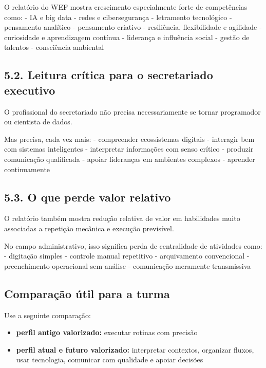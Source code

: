 \documentclass[
]{book}
\providecommand{\tightlist}{%
  \setlength{\itemsep}{0pt}\setlength{\parskip}{0pt}}
\theoremstyle{definition}
\theoremstyle{definition}
\theoremstyle{definition}
\theoremstyle{definition}
\theoremstyle{remark}
\begin{document}
O relatório do WEF mostra crescimento especialmente forte de competências como:
- IA e big data
- redes e cibersegurança
- letramento tecnológico
- pensamento analítico
- pensamento criativo
- resiliência, flexibilidade e agilidade
- curiosidade e aprendizagem contínua
- liderança e influência social
- gestão de talentos
- consciência ambiental

\subsection{5.2. Leitura crítica para o secretariado executivo}\label{leitura-cruxedtica-para-o-secretariado-executivo}

O profissional do secretariado não precisa necessariamente se tornar programador ou cientista de dados.

Mas precisa, cada vez mais:
- compreender ecossistemas digitais
- interagir bem com sistemas inteligentes
- interpretar informações com senso crítico
- produzir comunicação qualificada
- apoiar lideranças em ambientes complexos
- aprender continuamente

\subsection{5.3. O que perde valor relativo}\label{o-que-perde-valor-relativo}

O relatório também mostra redução relativa de valor em habilidades muito associadas a repetição mecânica e execução previsível.

No campo administrativo, isso significa perda de centralidade de atividades como:
- digitação simples
- controle manual repetitivo
- arquivamento convencional
- preenchimento operacional sem análise
- comunicação meramente transmissiva

\subsection{Comparação útil para a turma}\label{comparauxe7uxe3o-uxfatil-para-a-turma}

Use a seguinte comparação:

\begin{itemize}
\tightlist
\item
  \textbf{perfil antigo valorizado:} executar rotinas com precisão
\item
  \textbf{perfil atual e futuro valorizado:} interpretar contextos, organizar fluxos, usar tecnologia, comunicar com qualidade e apoiar decisões
\end{itemize}
\end{document}

